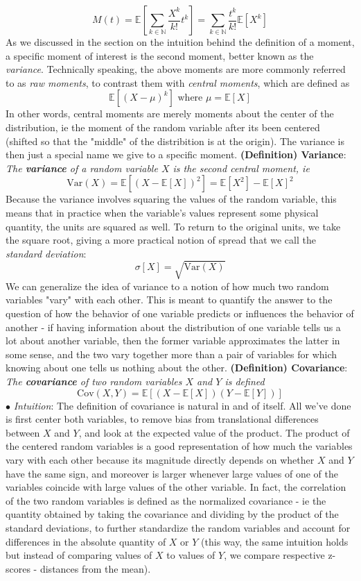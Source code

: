 \documentclass{article}
\newcommand*{\tb}{\textbf}
\newcommand*{\ti}{\textit}
\newcommand*{\nn}{\newline \newline}
\newcommand*{\In}{\indent \ensuremath{\bullet} \textit{Intuition}: }
\newcommand*{\N}{\mathbb{N}}
\newcommand*{\E}{\mathbb{E}}
\begin{document}
$$ M(t) = \E \left[ \sum_{k \in \N} \frac{X^k}{k!} t^k \right] = \sum_{k \in \N} \frac{t^k}{k!} \E[X^k] $$
\nn
As we discussed in the section on the intuition behind the definition of a moment, a specific moment of interest is the second moment, better known as the \ti{variance}. Technically speaking, the above moments are more commonly referred to as \ti{raw moments}, to contrast them with \ti{central moments}, which are defined as
$$ \E[(X - \mu)^k] \text{ where } \mu = \E[X] $$
In other words, central moments are merely moments about the center of the distribution, ie the moment of the random variable after its been centered (shifted so that the "middle" of the distribition is at the origin). The variance is then just a special name we give to a specific moment.
\nn
\tb{(Definition) Variance}: \ti{The \tb{variance} of a random variable $ X $ is the second central moment, ie}
$$ \text{Var}(X) = \E[(X - \E[X])^2] = \E[X^2] - \E[X]^2 $$
\nn
Because the variance involves squaring the values of the random variable, this means that in practice when the variable's values represent some physical quantity, the units are squared as well. To return to the original units, we take the square root, giving a more practical notion of spread that we call the \ti{standard deviation}:
$$ \sigma[X] = \sqrt{\text{Var}(X)} $$
We can generalize the idea of variance to a notion of how much two random variables "vary" with each other. This is meant to quantify the answer to the question of how the behavior of one variable predicts or influences the behavior of another - if having information about the distribution of one variable tells us a lot about another variable, then the former variable approximates the latter in some sense, and the two vary together more than a pair of variables for which knowing about one tells us nothing about the other.
\nn
\tb{(Definition) Covariance}: \ti{The \tb{covariance} of two random variables $ X $ and $ Y $ is defined}
$$ \text{Cov}(X, Y) = \E[(X - \E[X])(Y - \E[Y])] $$
\In The definition of covariance is natural in and of itself. All we've done is first center both variables, to remove bias from translational differences between $ X $ and $ Y $, and look at the expected value of the product. The product of the centered random variables is a good representation of how much the variables vary with each other because its magnitude directly depends on whether $ X $ and $ Y $ have the same sign, and moreover is larger whenever large values of one of the variables coincide with large values of the other variable. In fact, the correlation of the two random variables is defined as the normalized covariance - ie the quantity obtained by taking the covariance and dividing by the product of the standard deviations, to further standardize the random variables and account for differences in the absolute quantity of $ X $ or $ Y $ (this way, the same intuition holds but instead of comparing values of $ X $ to values of $ Y $, we compare respective z-scores - distances from the mean).
\end{document}
